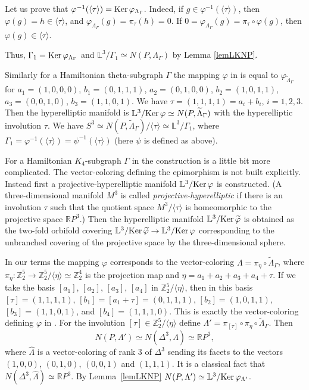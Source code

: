 \documentclass[12pt]{amsart}
\theoremstyle{definition}
\theoremstyle{remark}
\begin{document}
Let us prove that $\varphi^{-1}(\langle\tau\rangle)={\rm Ker}\,\varphi_{\Lambda_{\Gamma}}$.
Indeed, if $g\in \varphi^{-1}(\langle\tau\rangle)$, then $\varphi(g)=h\in \langle\tau\rangle$,
and $\varphi_{\Lambda_{\Gamma}}(g)=\pi_\tau(h)=0$. If $0=\varphi_{\Lambda_\Gamma}(g)=\pi_\tau\circ \varphi(g)$, 
then $\varphi(g)\in\langle\tau\rangle$.

Thus, $\Gamma_1={\rm Ker}\,\varphi_{\Lambda_{\Gamma}}$ and  
$\mathbb L^3/\Gamma_1\simeq N(P,\Lambda_\Gamma)$ by Lemma \ref{lemLKNP}.
   
Similarly for a Hamiltonian theta-subgraph $\Gamma$  
the mapping $\varphi$ in \cite{VM99S2} is equal to $\varphi_{\widetilde{\Lambda}_\Gamma}$ for
$a_1=(1,0,0,0)$, $b_1=(0,1,1,1)$, $a_2=(0,1,0,0)$, $b_2=(1,0,1,1)$, $a_3=(0,0,1,0)$, $b_3=(1,1,0,1)$.
We have $\tau=(1,1,1,1)=a_i+b_i$, $i=1,2,3$.  Then the hyperelliptic manifold is 
$\mathbb L^3/{\rm Ker}\,\varphi\simeq N(P,\widetilde{\Lambda}_\Gamma)$ with the hyperelliptic involution $\tau$.
We have $S^3\simeq N(P,\widetilde{\Lambda}_\Gamma)/\langle\tau\rangle\simeq \mathbb L^3/\Gamma_1$,
where $\Gamma_1=\varphi^{-1}(\langle\tau\rangle)=\psi^{-1}(\langle\tau\rangle)$ 
(here $\psi$ is defined as above).

For a Hamiltonian $K_4$-subgraph $\Gamma$ in \cite{VM99S2} the construction is a little bit more complicated. The vector-coloring defining the epimorphism is not built explicitly. Instead first a projective-hyperelliptic manifold $\mathbb L^3/{\rm Ker}\,\varphi$ is constructed. (A three-dimensional manifold $M^3$ is called {\it projective-hyperelliptic} if there is an involution
$\tau$ such that the quotient space $M^3/\langle\tau\rangle$ is homeomorphic to the projective space $\mathbb RP^3$.)
Then the hyperelliptic manifold $\mathbb L^3/{\rm Ker}\,\widetilde{\varphi}$ is obtained as the two-fold orbifold
covering $\mathbb L^3/{\rm Ker}\,\widetilde{\varphi}\to \mathbb L^3/{\rm Ker}\,\varphi$
corresponding to the unbranched covering of the projective space by the
three-dimensional sphere.

In our terms the mapping $\varphi$ corresponds to the vector-coloring $\Lambda=\pi_\eta\circ\widetilde{\Lambda}_\Gamma$,
where $\pi_\eta\colon\mathbb Z_2^5\to\mathbb Z_2^5/\langle\eta\rangle\simeq\mathbb Z_2^4$ is the projection
map and $\eta=a_1+a_2+a_3+a_4+\tau$. If we take the basis $[a_1]$, $[a_2]$, $[a_3]$, $[a_4]$ in $\mathbb Z_2^5/\langle\eta\rangle$, then in this basis $[\tau]=(1,1,1,1)$,
$[b_1]=[a_1+\tau]=(0,1,1,1)$, $[b_2]=(1,0,1,1)$, $[b_3]=(1,1,0,1)$, and
$[b_4]=(1,1,1,0)$. This is exactly the vector-coloring defining $\varphi$ in \cite[Theorem 3.3]{VM99S2}. 
For the involution $[\tau]\in\mathbb Z_2^5/\langle\eta\rangle$ define 
$\Lambda'=\pi_{[\tau]}\circ\pi_\eta\circ\widetilde{\Lambda}_\Gamma$.  Then 
$$
N(P,\Lambda')\simeq N(\Delta^3,\widehat{\Lambda})\simeq\mathbb RP^3,
$$
where $\widehat{\Lambda}$ is a vector-coloring of rank $3$ of $\Delta^3$ sending its facets
to the vectors $(1,0,0)$, $(0,1,0)$, $(0,0,1)$ and $(1,1,1)$. It is a classical fact that  
$N(\Delta^3,\widehat{\Lambda})\simeq\mathbb RP^3$. By Lemma~\ref{lemLKNP}
$N(P,\Lambda')\simeq \mathbb L^3/{\rm Ker}\,\varphi_{\Lambda'}$.
\end{document}
